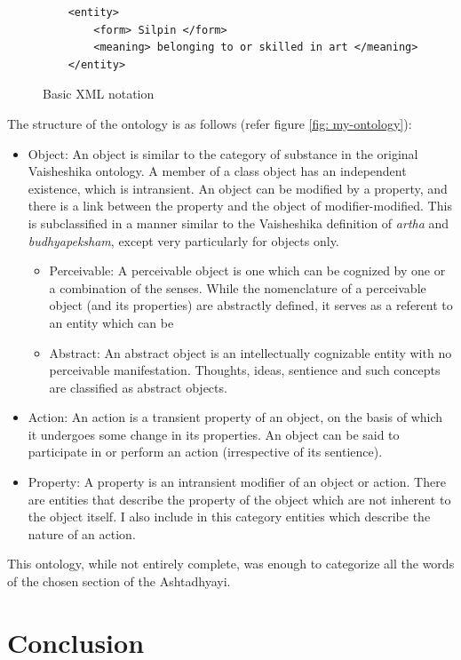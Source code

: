 \documentclass[final, 12pt]{elsarticle}
\begin{document}
\begin{figure}
    \centering
    \begin{verbatim}
    <entity>
        <form> Silpin </form>
        <meaning> belonging to or skilled in art </meaning>
    </entity>
    \end{verbatim}
    \caption{Basic XML notation}
    \label{fig: example}
\end{figure}

The structure of the ontology is as follows (refer figure \ref{fig: my-ontology}):
\begin{itemize}
    \item Object: An object is similar to the category of substance in the original Vaisheshika ontology. A member of a class object has an independent existence, which is intransient. An object can be modified by a property, and there is a link between the property and the object of modifier-modified. This is subclassified in a manner similar to the Vaisheshika definition of \emph{artha} and \emph{budhyapeksham}, except very particularly for objects only.
    \begin{itemize}
        \item Perceivable: A perceivable object is one which can be cognized by one or a combination of the senses. While the nomenclature of a perceivable object (and its properties) are abstractly defined, it serves as a referent to an entity which can be 
        \item Abstract: An abstract object is an intellectually cognizable entity with no perceivable manifestation. Thoughts, ideas, sentience and such concepts are classified as abstract objects.
    \end{itemize}
    \item Action: An action is a transient property of an object, on the basis of which it undergoes some change in its properties. An object can be said to participate in or perform an action (irrespective of its sentience).
    \item Property: A property is an intransient modifier of an object or action. There are entities that describe the property of the object which are not inherent to the object itself. I also include in this category entities which describe the nature of an action.
\end{itemize}

This ontology, while not entirely complete, was enough to categorize all the words of the chosen section of the Ashtadhyayi.

\section{Conclusion}
\end{document}
